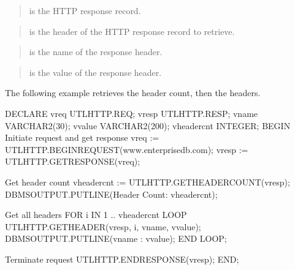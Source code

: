 \documentclass[letterpaper,10pt,english,openany,oneside]{sphinxmanual}
\begin{document}

\begin{quote}

 is the HTTP response record.
\end{quote}

\begin{quote}

 is the  header of the HTTP response record to retrieve.
\end{quote}

\begin{quote}

 is the name of the response header.
\end{quote}

\begin{quote}

 is the value of the response header.
\end{quote}

\newpage


The following example retrieves the header count, then the headers.

%
\begin{sphinxVerbatim}[commandchars=\\\{\}]
DECLARE
    v\PYGZus{}req           UTL\PYGZus{}HTTP.REQ;
    v\PYGZus{}resp          UTL\PYGZus{}HTTP.RESP;
    v\PYGZus{}name          VARCHAR2(30);
    v\PYGZus{}value         VARCHAR2(200);
    v\PYGZus{}header\PYGZus{}cnt    INTEGER;
BEGIN
 \PYGZhy{}\PYGZhy{} Initiate request and get response
    v\PYGZus{}req := UTL\PYGZus{}HTTP.BEGIN\PYGZus{}REQUEST(\PYGZsq{}www.enterprisedb.com\PYGZsq{});
    v\PYGZus{}resp := UTL\PYGZus{}HTTP.GET\PYGZus{}RESPONSE(v\PYGZus{}req);

 \PYGZhy{}\PYGZhy{} Get header count
    v\PYGZus{}header\PYGZus{}cnt := UTL\PYGZus{}HTTP.GET\PYGZus{}HEADER\PYGZus{}COUNT(v\PYGZus{}resp);
    DBMS\PYGZus{}OUTPUT.PUT\PYGZus{}LINE(\PYGZsq{}Header Count: \PYGZsq{} \textbar{}\textbar{} v\PYGZus{}header\PYGZus{}cnt);

 \PYGZhy{}\PYGZhy{} Get all headers
    FOR i IN 1 .. v\PYGZus{}header\PYGZus{}cnt LOOP
        UTL\PYGZus{}HTTP.GET\PYGZus{}HEADER(v\PYGZus{}resp, i, v\PYGZus{}name, v\PYGZus{}value);
        DBMS\PYGZus{}OUTPUT.PUT\PYGZus{}LINE(v\PYGZus{}name \textbar{}\textbar{} \PYGZsq{}: \PYGZsq{} \textbar{}\textbar{} v\PYGZus{}value);
    END LOOP;

 \PYGZhy{}\PYGZhy{} Terminate request
    UTL\PYGZus{}HTTP.END\PYGZus{}RESPONSE(v\PYGZus{}resp);
END;
\end{sphinxVerbatim}
\end{document}
